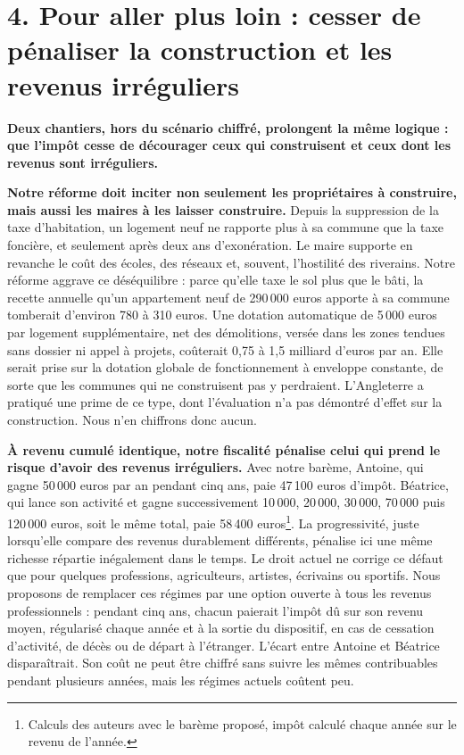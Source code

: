 \section{4. Pour aller plus loin : cesser de pénaliser la construction et les revenus irréguliers}

\textbf{Deux chantiers, hors du scénario chiffré, prolongent la même logique : que l'impôt cesse de décourager ceux
qui construisent et ceux dont les revenus sont irréguliers.}

\textbf{Notre réforme doit inciter non seulement les propriétaires à construire, mais aussi les maires à les laisser
construire.} Depuis la suppression de la taxe d'habitation, un logement neuf ne rapporte plus à sa commune que la taxe
foncière, et seulement après deux ans d'exonération. Le maire supporte en revanche le coût des écoles, des réseaux et,
souvent, l'hostilité des riverains. Notre réforme aggrave ce déséquilibre : parce qu'elle taxe le sol plus que le bâti,
la recette annuelle qu'un appartement neuf de 290\,000 euros apporte à sa commune tomberait d'environ 780 à 310 euros.
Une dotation automatique de 5\,000 euros par logement supplémentaire, net des démolitions, versée dans les zones
tendues sans dossier ni appel à projets, coûterait 0,75 à 1,5 milliard d'euros par an. Elle serait prise sur la dotation
globale de fonctionnement à enveloppe constante, de sorte que les communes qui ne construisent pas y perdraient.
L'Angleterre a pratiqué une prime de ce type, dont l'évaluation n'a pas démontré d'effet sur la construction. Nous n'en
chiffrons donc aucun.

\textbf{À revenu cumulé identique, notre fiscalité pénalise celui qui prend le risque d'avoir des revenus irréguliers.}
Avec notre barème, Antoine, qui gagne 50\,000 euros par an pendant cinq ans, paie 47\,100 euros d'impôt. Béatrice, qui
lance son activité et gagne successivement 10\,000, 20\,000, 30\,000, 70\,000 puis 120\,000 euros, soit le même total,
paie 58\,400 euros\footnote{Calculs des auteurs avec le barème proposé, impôt calculé chaque année sur le revenu de l'année.}. La progressivité, juste lorsqu'elle compare des revenus durablement différents, pénalise ici une
même richesse répartie inégalement dans le temps. Le droit actuel ne corrige ce défaut que pour quelques professions,
agriculteurs, artistes, écrivains ou sportifs. Nous proposons de remplacer ces régimes par une option ouverte à tous les
revenus professionnels : pendant cinq ans, chacun paierait l'impôt dû sur son revenu moyen, régularisé chaque année et à
la sortie du dispositif, en cas de cessation d'activité, de décès ou de départ à l'étranger. L'écart entre Antoine et
Béatrice disparaîtrait. Son coût ne peut être chiffré sans suivre les mêmes contribuables pendant plusieurs années, mais
les régimes actuels coûtent peu.
